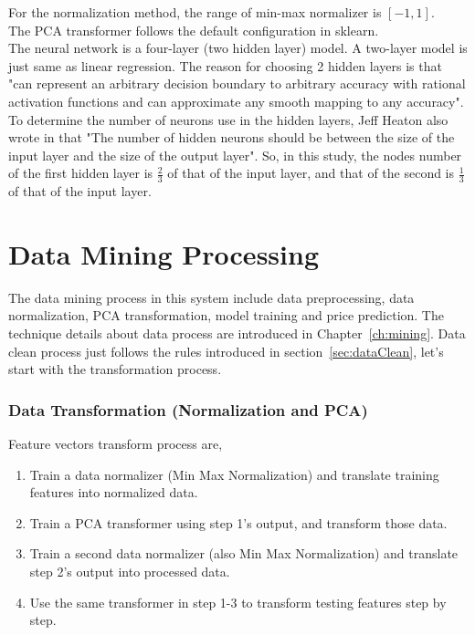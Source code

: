 For the normalization method, the range of min-max normalizer is $ [-1, 1] $.\\

The PCA transformer follows the default configuration in sklearn.\\

The neural network is a four-layer (two hidden layer) model. A two-layer model is just same as linear regression. The reason for choosing 2 hidden layers is that "can represent an arbitrary decision boundary to arbitrary accuracy with rational activation functions and can approximate any smooth mapping to any accuracy"\cite[p.~128]{heaton2008introduction}.\\


To determine the number of neurons use in the hidden layers, Jeff Heaton also wrote in \cite[p.~129]{heaton2008introduction} that "The number of hidden neurons should be between the size of the input layer and the size of the output layer". So, in this study, the nodes number of the first hidden layer is $ \frac{2}{3} $ of that of the input layer, and that of the second is $ \frac{1}{3} $ of that of the input layer.

\section{Data Mining Processing}
The data mining process in this system include data preprocessing, data normalization, PCA transformation, model training and price prediction. The technique details about data process are introduced in Chapter~\ref{ch:mining}. Data clean process just follows the rules introduced in section~\ref{sec:dataClean}, let's start with the transformation process.

\subsubsection{Data Transformation (Normalization and PCA)}

Feature vectors transform process are,
\begin{enumerate}
	\item Train a data normalizer (Min Max Normalization) and translate training features into normalized data.
	\item Train a PCA transformer using step 1's output, and transform those data.
	\item Train a second data normalizer (also Min Max Normalization) and translate step 2's output into processed data.
	\item Use the same transformer in step 1-3 to transform testing features step by step.
\end{enumerate}

